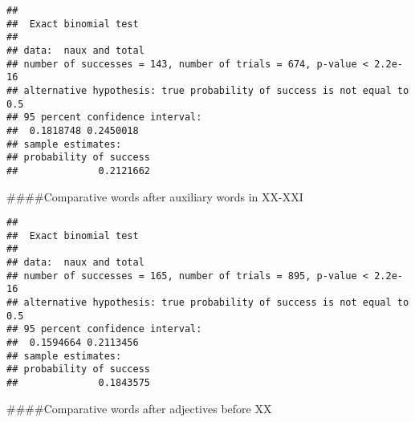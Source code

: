 \documentclass[
]{article}
\newenvironment{Shaded}{\begin{snugshade}}{\end{snugshade}}
\newcommand{\DecValTok}[1]{\textcolor[rgb]{0.00,0.00,0.81}{#1}}
\newcommand{\KeywordTok}[1]{\textcolor[rgb]{0.13,0.29,0.53}{\textbf{#1}}}
\newcommand{\NormalTok}[1]{#1}
\newcommand{\OperatorTok}[1]{\textcolor[rgb]{0.81,0.36,0.00}{\textbf{#1}}}
\newcommand{\StringTok}[1]{\textcolor[rgb]{0.31,0.60,0.02}{#1}}
\begin{document}
\begin{verbatim}
## 
##  Exact binomial test
## 
## data:  naux and total
## number of successes = 143, number of trials = 674, p-value < 2.2e-16
## alternative hypothesis: true probability of success is not equal to 0.5
## 95 percent confidence interval:
##  0.1818748 0.2450018
## sample estimates:
## probability of success 
##              0.2121662
\end{verbatim}

\#\#\#\#Comparative words after auxiliary words in XX-XXI

\begin{Shaded}
\end{Shaded}

\begin{verbatim}
## 
##  Exact binomial test
## 
## data:  naux and total
## number of successes = 165, number of trials = 895, p-value < 2.2e-16
## alternative hypothesis: true probability of success is not equal to 0.5
## 95 percent confidence interval:
##  0.1594664 0.2113456
## sample estimates:
## probability of success 
##              0.1843575
\end{verbatim}

\#\#\#\#Comparative words after adjectives before XX

\begin{Shaded}
\end{Shaded}
\end{document}
